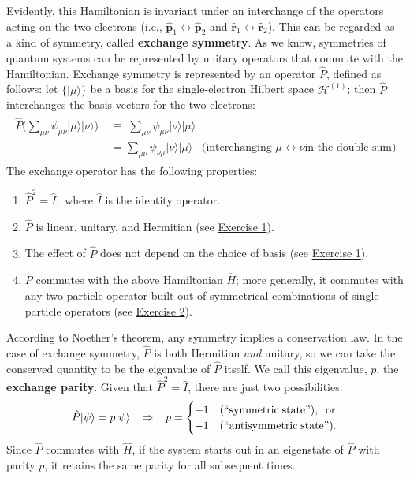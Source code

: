 \documentclass[pra,12pt]{revtex4}
\begin{document}
Evidently, this Hamiltonian is invariant under an interchange of the
operators acting on the two electrons (i.e., $\hat{\mathbf{p}}_1
\leftrightarrow \hat{\mathbf{p}}_2$ and $\hat{\mathbf{r}}_1
\leftrightarrow \hat{\mathbf{r}}_2$).  This can be regarded as a kind
of symmetry, called \textbf{exchange symmetry}.  As we know,
symmetries of quantum systems can be represented by unitary operators
that commute with the Hamiltonian.  Exchange symmetry is represented
by an operator $\hat{P}$, defined as follows: let $\{|\mu\rangle\}$
be a basis for the single-electron Hilbert space $\mathscr{H}^{(1)}$;
then $\hat{P}$ interchanges the basis vectors for the two electrons:
\begin{align}
  \begin{aligned}\hat{P} \Big (\sum_{\mu\nu}
    \psi_{\mu\nu} |\mu\rangle|\nu\rangle \Big)
    \;&\equiv\;  \sum_{\mu\nu} \psi_{\mu\nu} |\nu\rangle|\mu\rangle \\
    &= \sum_{\mu\nu} \psi_{\nu\mu} |\nu\rangle|\mu\rangle
    \;\;\;\textrm{(interchanging $\mu\leftrightarrow \nu$
      in the double sum)}\end{aligned}
\end{align}
The exchange operator has the following properties:
\begin{enumerate}
\item $\hat{P}^2 = \hat{I},$ where $\hat{I}$ is the identity operator.

\item $\hat{P}$ is linear, unitary, and Hermitian (see
  \hyperref[ex:1]{Exercise 1}).
  
\item The effect of $\hat{P}$ does not depend on the choice
  of basis (see \hyperref[ex:1]{Exercise 1}).

\item $\hat{P}$ commutes with the above Hamiltonian $\hat{H}$; more
  generally, it commutes with any two-particle operator built out of
  symmetrical combinations of single-particle operators (see
  \hyperref[ex:2]{Exercise 2}).
\end{enumerate}

According to Noether's theorem, any symmetry implies a conservation
law.  In the case of exchange symmetry, $\hat{P}$ is both Hermitian
\textit{and} unitary, so we can take the conserved quantity to be the
eigenvalue of $\hat{P}$ itself.  We call this eigenvalue, $p$, the
\textbf{exchange parity}.  Given that $\hat{P}^2 = \hat{I}$, there are
just two possibilities:
\begin{equation}
  \hat{P} |\psi\rangle = p|\psi\rangle \;\;\;\Rightarrow\;\;\; p = \begin{cases}+1 & \textrm{(``symmetric\;state'')}, \;\;\textrm{or} \\ -1 & \textrm{(``antisymmetric\;state'').}\end{cases}
\end{equation}
Since $\hat{P}$ commutes with $\hat{H}$, if the system starts out in
an eigenstate of $\hat{P}$ with parity $p$, it retains the same parity
for all subsequent times.
\end{document}
